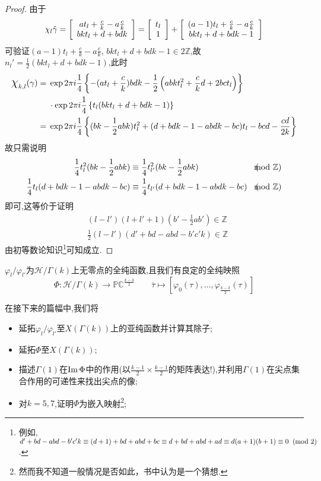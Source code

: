 \begin{proof}
	由于
	$$\chi_l\hat{\gamma}=\left[\begin{array}{c}{at_l+\frac{c}{k}-a\frac{c}{k}} \\ {bkt_l+d+bdk}\end{array}\right]=\left[\begin{array}{c}{t_l} \\ {1}\end{array}\right]+\left[\begin{array}{c}{(a-1)t_l+\frac{c}{k}-a\frac{c}{k}} \\ {bkt_l+d+bdk-1}\end{array}\right]$$
	可验证$(a-1)t_l+\frac{c}{k}-a\frac{c}{k}$, $bkt_l+d+bdk-1 \in 2\mathbb{Z}$,故$n_l'=\frac{1}{2}(bkt_l+d+bdk-1)$,此时
	\begin{equation*}
	\begin{aligned}
	\mbox{\Large$\chi$}_{k,l}(\gamma)=\;& \exp 2\pi i \frac{1}{4} \left\{ -(at_l+\frac{c}{k})bdk-\frac{1}{2} \left( abkt_l^2+\frac{c}{k}d+2bct_l \right) \right\}\\
	& \cdot \exp 2\pi i \frac{1}{4} \left\{ t_l(bkt_l+d+bdk-1)  \right\}\\
	=\;& \exp 2\pi i \frac{1}{4} \left\{ (bk-\frac{1}{2}abk)t_l^2 +(d+bdk-1-abdk-bc)t_l-bcd-\frac{cd}{2k} \right\}
	\end{aligned}
	\end{equation*}
	故只需说明
	\begin{equation*}
	\begin{aligned}
	\frac{1}{4}t_l^2 (bk-\frac{1}{2}abk) \equiv\;&\frac{1}{4}t_{l'}^2 (bk-\frac{1}{2}abk) &(\hspace{-4.3mm}\mod \mathbb{Z})\\
	\frac{1}{4}t_l(d+bdk-1-abdk-bc) \equiv\;& \frac{1}{4}t_{l'}(d+bdk-1-abdk-bc)  &(\hspace{-4.3mm}\mod \mathbb{Z})
	\end{aligned}
	\end{equation*}
	即可,这等价于证明
	\begin{equation*}
	\begin{aligned}
	&(l-l')(l+l'+1)(b'-\frac{1}{2}ab') \in \mathbb{Z}\\
	&\frac{1}{2}(l-l')(d'+bd-abd-b'c'k) \in \mathbb{Z}
	\end{aligned}
	\end{equation*}
	由初等数论知识\footnote{例如, $d'+bd-abd-b'c'k \equiv (d+1) +bd+abd+bc \equiv d+bd+abd+ad \equiv d(a+1)(b+1) \equiv 0 \;\;(\hspace{-2.4mm}\mod 2)$.}可知成立.
\end{proof}
\begin{corollary}
	$\varphi_l/\varphi_{l'}$为$\mathcal{H}/\Gamma(k)$上无零点的全纯函数,且我们有良定的全纯映照
	$$\Phi: \mathcal{H}/\Gamma(k) \longrightarrow \mathbb{PC}^{\frac{k-3}{2}} \qquad \bar{\tau} \longmapsto \left[ \varphi_0(\tau),\ldots , \varphi_{\frac{k-3}{2}}(\tau) \right]$$
\end{corollary}

在接下来的篇幅中,我们将
\begin{itemize}
	\item 延拓$\varphi_l/\varphi_{l'}$至$X(\Gamma(k))$上的亚纯函数并计算其除子;
	\item 延拓$\Phi$至$X(\Gamma(k))$;
	\item 描述$\Gamma(1)$在$\operatorname{\operatorname{Im}} \Phi$中的作用(以$\frac{k-1}{2} \times \frac{k-1}{2}$的矩阵表达!),并利用$\Gamma(1)$在尖点集合作用的可递性来找出尖点的像;
	\item 对$k=5,7$,证明$\Phi$为嵌入映射\footnote{然而我不知道一般情况是否如此，书中认为是一个猜想.};
\end{itemize}
